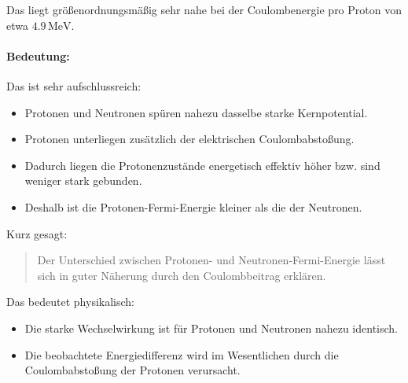 \documentclass[11pt,a4paper]{scrartcl}
\begin{document}
\begin{enumerate}
\begin{calculationbox}
                    Das liegt größenordnungsmäßig sehr nahe bei der Coulombenergie pro Proton von etwa $4.9\,\mathrm{MeV}$.

                    \paragraph{Bedeutung:}

                    Das ist sehr aufschlussreich:
                    \begin{itemize}
                        \item Protonen und Neutronen spüren nahezu dasselbe starke Kernpotential.
                        \item Protonen unterliegen zusätzlich der elektrischen Coulombabstoßung.
                        \item Dadurch liegen die Protonenzustände energetisch effektiv höher bzw. sind weniger stark gebunden.
                        \item Deshalb ist die Protonen-Fermi-Energie kleiner als die der Neutronen.
                    \end{itemize}

                    Kurz gesagt:
                    \begin{quote}
                    Der Unterschied zwischen Protonen- und Neutronen-Fermi-Energie lässt sich in guter Näherung durch den Coulombbeitrag erklären.
                    \end{quote}

                    Das bedeutet physikalisch:
                    \begin{itemize}
                        \item Die starke Wechselwirkung ist für Protonen und Neutronen nahezu identisch.
                        \item Die beobachtete Energiedifferenz wird im Wesentlichen durch die Coulombabstoßung der Protonen verursacht.
                    \end{itemize}
                \end{calculationbox}
        \end{enumerate}
\end{document}
